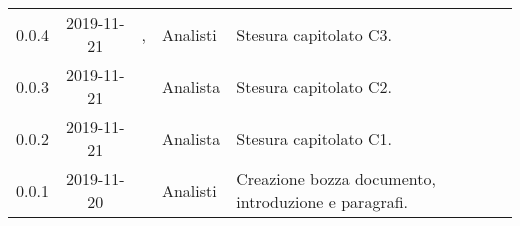 {\begin{longtable}{ c c  C{4cm}  C{3cm} C{4cm}}
0.0.4 & 2019-11-21 & \LD{}, \CE{} & Analisti & Stesura capitolato C3. \\

0.0.3 & 2019-11-21 & \AT{} & Analista & Stesura capitolato C2. \\

0.0.2 & 2019-11-21 & \PF{} & Analista & Stesura capitolato C1. \\
		
0.0.1 & 2019-11-20 & \Gruppo{} & Analisti & Creazione bozza documento, introduzione e paragrafi. \\
		
\end{longtable}
}
